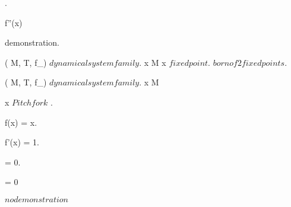 \documentclass[../Main/main]{subfiles}
\begin{document}
{{{			 .

			f''(x) 
		}
		\demonstration
		{
			demonstration.
		}
	}
	
	{
		{
			( M, T, f_\lambda ) $ dynamical system family $.
			x \in M
		}
		{
			x $ fixed point $.
			$ born of 2 fixed points $.
		}
	}


	
	{
		{
			( M, T, f_\lambda ) $ dynamical system family $.
			x \in M
		}
		\holds
		{
			x $ Pitchfork $ \ifandonlyif.

			f(x) = x.

			f'(x) = 1.

			 = 0.

			 = 0
		}
		\demonstration
		{
			$ no demonstration $
		}
	}
	

}
\end{document}
